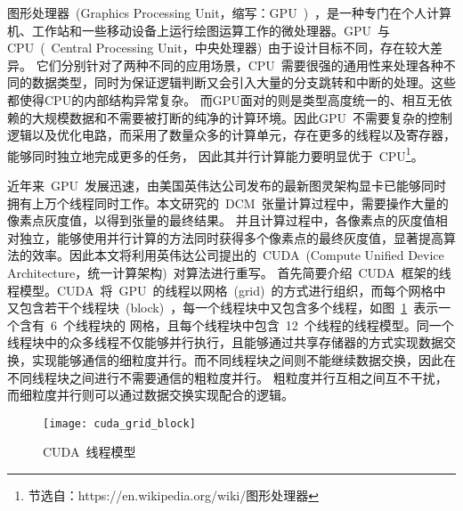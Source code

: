图形处理器~(Graphics Processing Unit，缩写：GPU~)~，是一种专门在个人计算机、工作站和一些移动设备上运行绘图运算工作的微处理器。GPU~与CPU~(~Central Processing Unit，中央处理器)~由于设计目标不同，存在较大差异。
它们分别针对了两种不同的应用场景，CPU~需要很强的通用性来处理各种不同的数据类型，同时为保证逻辑判断又会引入大量的分支跳转和中断的处理。这些都使得CPU的内部结构异常复杂。
而GPU面对的则是类型高度统一的、相互无依赖的大规模数据和不需要被打断的纯净的计算环境。因此GPU~不需要复杂的控制逻辑以及优化电路，而采用了数量众多的计算单元，存在更多的线程以及寄存器，能够同时独立地完成更多的任务，
因此其并行计算能力要明显优于~CPU\footnote{节选自：https://en.wikipedia.org/wiki/图形处理器}。

近年来~GPU~发展迅速，由美国英伟达公司发布的最新图灵架构显卡已能够同时拥有上万个线程同时工作。本文研究的~DCM~张量计算过程中，需要操作大量的像素点灰度值，以得到张量的最终结果。
并且计算过程中，各像素点的灰度值相对独立，能够使用并行计算的方法同时获得多个像素点的最终灰度值，显著提高算法的效率。因此本文将利用英伟达公司提出的~CUDA~(Compute Unified Device Architecture，统一计算架构)~对算法进行重写。
首先简要介绍~CUDA~框架的线程模型。CUDA~将~GPU~的线程以网格~(grid)~的方式进行组织，而每个网格中又包含若干个线程块~(block)~，每一个线程块中又包含多个线程，如图~\ref{fig:chap04:cuda_grid_block}~表示一个含有~6~个线程块的
网格，且每个线程块中包含~12~个线程的线程模型。同一个线程块中的众多线程不仅能够并行执行，且能够通过共享存储器的方式实现数据交换，实现能够通信的细粒度并行。而不同线程块之间则不能继续数据交换，因此在不同线程块之间进行不需要通信的粗粒度并行。
粗粒度并行互相之间互不干扰，而细粒度并行则可以通过数据交换实现配合的逻辑。

\begin{figure}[t] %
  \centering%
    \texttt{[image: cuda\_grid\_block]}
  \caption{CUDA~线程模型}
    \label{fig:chap04:cuda_grid_block}
\end{figure}

